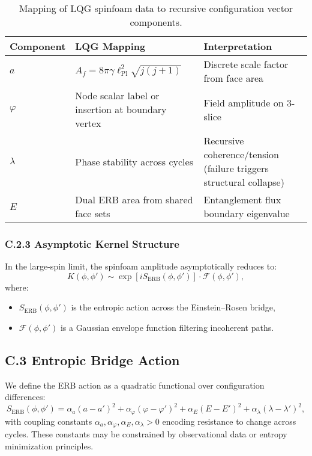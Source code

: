 \begin{table}[H]
\centering
\begin{tabular}{lll}
\toprule
\textbf{Component} & \textbf{LQG Mapping} & \textbf{Interpretation} \\
\midrule
\( a \) & \( A_f = 8\pi \gamma \ell_{\text{Pl}}^2 \sqrt{j(j+1)} \) & Discrete scale factor from face area \\
\( \varphi \) & Node scalar label or insertion at boundary vertex & Field amplitude on 3-slice \\
\( \lambda \) & Phase stability across cycles & Recursive coherence/tension (failure triggers structural collapse) \\
\( E \) & Dual ERB area from shared face sets & Entanglement flux boundary eigenvalue \\
\bottomrule
\end{tabular}
\caption{Mapping of LQG spinfoam data to recursive configuration vector components.}
\end{table}

\subsubsection*{C.2.3 Asymptotic Kernel Structure}

In the large-spin limit, the spinfoam amplitude asymptotically reduces to:
\[
K(\phi, \phi') \sim \exp\left[i S_{\text{ERB}}(\phi, \phi')\right] \cdot \mathcal{F}(\phi, \phi'),
\]
where:
\begin{itemize}
  \item \( S_{\text{ERB}}(\phi, \phi') \) is the entropic action across the Einstein--Rosen bridge,
  \item \( \mathcal{F}(\phi, \phi') \) is a Gaussian envelope function filtering incoherent paths.
\end{itemize}

\subsection*{C.3 Entropic Bridge Action}

We define the ERB action as a quadratic functional over configuration differences:
\[
S_{\text{ERB}}(\phi, \phi') = \alpha_a (a - a')^2 + \alpha_\varphi (\varphi - \varphi')^2 + \alpha_E (E - E')^2 + \alpha_\lambda (\lambda - \lambda')^2,
\]
with coupling constants \(\alpha_a, \alpha_\varphi, \alpha_E, \alpha_\lambda > 0\) encoding resistance to change across cycles. These constants may be constrained by observational data or entropy minimization principles.

